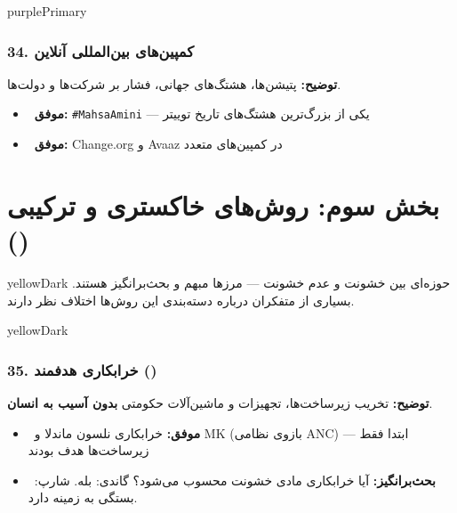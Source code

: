 \documentclass[a4paper,12pt]{article}
\newcommand{\success}[1]{\textcolor{greenPrimary}{\faCheckCircle\ \textbf{موفق:}} #1}
\newcommand{\debate}[1]{\textcolor{orangePrimary}{\faQuestionCircle\ \textbf{بحث‌برانگیز:}} #1}
\newcommand{\methodnum}[1]{\textcolor{purpleLight}{\textbf{#1.}}}
\begin{document}
\begin{methodcard}{purplePrimary}
\subsubsection{\methodnum{34} کمپین‌های بین‌المللی آنلاین}
\textbf{توضیح:} پتیشن‌ها، هشتگ‌های جهانی، فشار بر شرکت‌ها و دولت‌ها.

\begin{itemize}[label=\textcolor{greenPrimary}{\faCheckCircle}]
  \item \success{\texttt{\#MahsaAmini} — یکی از بزرگ‌ترین هشتگ‌های تاریخ توییتر}
  \item \success{Change.org و Avaaz در کمپین‌های متعدد}
\end{itemize}
\end{methodcard}



\section{\textcolor{yellowDark}{\faBolt} بخش سوم: روش‌های خاکستری و ترکیبی ()}

\begin{sectionbox}{yellowDark}
حوزه‌ای بین خشونت و عدم خشونت — مرزها مبهم و بحث‌برانگیز هستند. بسیاری از متفکران درباره دسته‌بندی این روش‌ها اختلاف نظر دارند.
\end{sectionbox}

\begin{methodcard}{yellowDark}
\subsubsection{\methodnum{35} خرابکاری هدفمند ()}
\textbf{توضیح:} تخریب زیرساخت‌ها، تجهیزات و ماشین‌آلات حکومتی \textbf{بدون آسیب به انسان}.

\begin{itemize}[label=\textcolor{greenPrimary}{\faCheckCircle}]
  \item \success{خرابکاری نلسون ماندلا و MK (بازوی نظامی ANC) — ابتدا فقط زیرساخت‌ها هدف بودند}
\end{itemize}
\begin{itemize}[label=\textcolor{yellowPrimary}{\faExclamationTriangle}]
  \item \debate{آیا خرابکاری مادی خشونت محسوب می‌شود؟ گاندی: بله. شارپ: بستگی به زمینه دارد.}
\end{itemize}
\end{methodcard}
\end{document}
